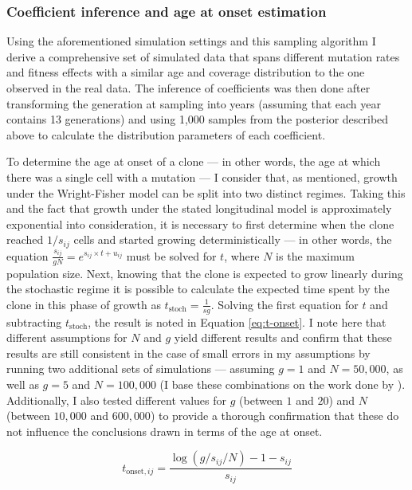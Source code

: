 \subsubsection{Coefficient inference and age at onset estimation}

Using the aforementioned simulation settings and this sampling algorithm I derive a comprehensive set of simulated data that spans different mutation rates and fitness effects with a similar age and coverage distribution to the one observed in the real data. The inference of coefficients was then done after transforming the generation at sampling into years (assuming that each year contains 13 generations) and using 1,000 samples from the posterior described above to calculate the distribution parameters of each coefficient. 

To determine the age at onset of a clone --- in other words, the age at which there was a single cell with a mutation --- I consider that, as mentioned, growth under the Wright-Fisher model can be split into two distinct regimes. Taking this and the fact that growth under the stated longitudinal model is approximately exponential into consideration, it is necessary to first determine when the clone reached $1/s_{ij}$ cells and started growing deterministically --- in other words, the equation $\frac{s_{ij}}{gN} = e^{s_{ij} \times t + u_{ij}}$ must be solved for $t$, where $N$ is the maximum population size. Next, knowing that the clone is expected to grow linearly during the stochastic regime it is possible to calculate the expected time spent by the clone in this phase of growth as $t_{\mathrm{stoch}} = \frac{1}{sg}$. Solving the first equation for $t$ and subtracting $t_{\mathrm{stoch}}$, the result is noted in Equation \eqref{eq:t-onset}. I note here that different assumptions for $N$ and $g$ yield different results and confirm that these results are still consistent in the case of small errors in my assumptions by running two additional sets of simulations --- assuming $g=1$ and $N=50,000$, as well as $g=5$ and $N=100,000$ (I base these combinations on the work done by  \cite{Lee-Six2018-lp}). Additionally, I also tested different values for $g$ (between $1$ and $20$) and $N$ (between $10,000$ and $600,000$) to provide a thorough confirmation that these do not influence the conclusions drawn in terms of the age at onset.

\begin{equation}\label{eq:t-onset}
	t_{\mathrm{onset},ij} = \frac{\log(g/s_{ij}/N)-1-s_{ij}}{s_{ij}}
\end{equation}

